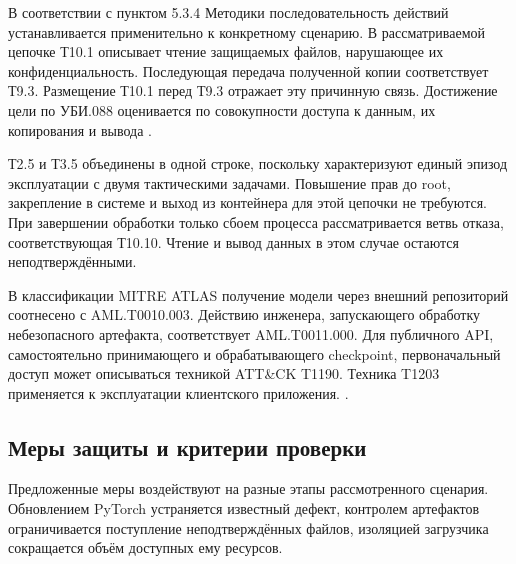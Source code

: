 \documentclass[12pt,a4paper]{report}
\begin{document}
В соответствии с пунктом 5.3.4 Методики последовательность действий устанавливается применительно к конкретному сценарию. В рассматриваемой цепочке Т10.1 описывает чтение защищаемых файлов, нарушающее их конфиденциальность. Последующая передача полученной копии соответствует Т9.3. Размещение Т10.1 перед Т9.3 отражает эту причинную связь. Достижение цели по УБИ.088 оценивается по совокупности доступа к данным, их копирования и вывода \cite{fstekmethod}.

Т2.5 и Т3.5 объединены в одной строке, поскольку характеризуют единый эпизод эксплуатации с двумя тактическими задачами. Повышение прав до root, закрепление в системе и выход из контейнера для этой цепочки не требуются. При завершении обработки только сбоем процесса рассматривается ветвь отказа, соответствующая Т10.10. Чтение и вывод данных в этом случае остаются неподтверждёнными.

В классификации MITRE ATLAS получение модели через внешний репозиторий соотнесено с AML.T0010.003. Действию инженера, запускающего обработку небезопасного артефакта, соответствует AML.T0011.000. Для публичного API, самостоятельно принимающего и обрабатывающего checkpoint, первоначальный доступ может описываться техникой ATT\&CK T1190. Техника T1203 применяется к эксплуатации клиентского приложения. \cite{atlas202610,attack1190,attack1203}.

\subsection{Меры защиты и критерии проверки}

Предложенные меры воздействуют на разные этапы рассмотренного сценария. Обновлением PyTorch устраняется известный дефект, контролем артефактов ограничивается поступление неподтверждённых файлов, изоляцией загрузчика сокращается объём доступных ему ресурсов.
\end{document}
